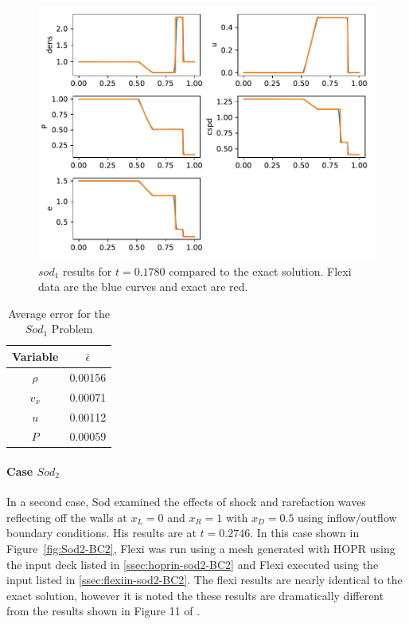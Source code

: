 \begin{figure}[h!]
 \centering
 \includegraphics[scale=0.8]{figures/sod1-BC9-PV.pdf}
 \caption{$sod_1$ results for $t = 0.1780$ compared to the exact solution. Flexi data are the blue curves and exact are red.}
 \label{fig:Sod1-1}
\end{figure}

\begin{table}[h!]
 \centering
 \begin{tabular}{|c|c|} \hline
   Variable & $\bar{\epsilon}$ \\ \hline \hline
   $\rho$ & 0.00156 \\
   $v_x$  & 0.00071 \\
   $u$     & 0.00112 \\
   $P$     & 0.00059 \\ \hline
 \end{tabular}
 \caption{Average error for the $Sod_1$ Problem}\label{tab:sod1Eps}
\end{table}


\paragraph{Case $Sod_2$}

In a second case, Sod examined the effects of shock and rarefaction waves reflecting off the walls at $x_L = 0$ and $x_R = 1$ with $x_D = 0.5$ using inflow/outflow boundary conditions.  His results are at $t = 0.2746$. In this case shown in Figure~\ref{fig:Sod2-BC2}, Flexi was run using a mesh generated with HOPR using the input deck listed in \ref{ssec:hoprin-sod2-BC2} and Flexi executed using the input listed in \ref{ssec:flexiin-sod2-BC2}. The flexi results are nearly identical to the exact solution, however it is noted the these results are dramatically different from the results shown in Figure 11 of \cite{sod1}.

